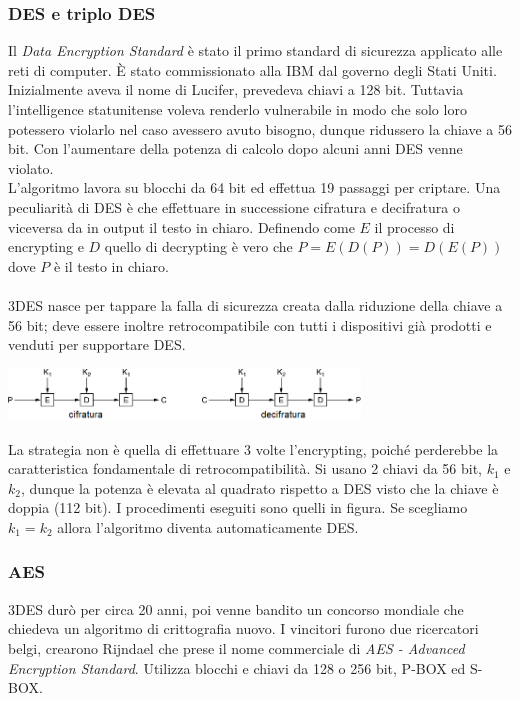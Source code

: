 \documentclass[10pt,a4paper,twoside]{article}
\begin{document}
\subsubsection{DES e triplo DES}
Il \textit{Data Encryption Standard} è stato il primo standard di sicurezza applicato alle reti di computer. È stato commissionato alla IBM dal governo degli Stati Uniti. Inizialmente aveva il nome di Lucifer, prevedeva chiavi a 128 bit. Tuttavia l'intelligence statunitense voleva renderlo vulnerabile in modo che solo loro potessero violarlo nel caso avessero avuto bisogno, dunque ridussero la chiave a 56 bit. Con l'aumentare della potenza di calcolo dopo alcuni anni DES venne violato.\\
L'algoritmo lavora su blocchi da 64 bit ed effettua 19 passaggi per criptare. Una peculiarità di DES è che effettuare in successione cifratura e decifratura o viceversa da in output il testo in chiaro. Definendo come $E$ il processo di encrypting e $D$ quello di decrypting è vero che $P=E(D(P))=D(E(P))$ dove $P$ è il testo in chiaro.\\\\
3DES nasce per tappare la falla di sicurezza creata dalla riduzione della chiave a 56 bit; deve essere inoltre retrocompatibile con tutti i dispositivi già prodotti e venduti per supportare DES.
\begin{center}
\includegraphics[width=0.7\textwidth]{images/3DES.png}
\end{center}
La strategia non è quella di effettuare 3 volte l'encrypting, poiché perderebbe la caratteristica fondamentale di retrocompatibilità. Si usano 2 chiavi da 56 bit, $k_1$ e $k_2$, dunque la potenza è elevata al quadrato rispetto a DES visto che la chiave è doppia (112 bit). I procedimenti eseguiti sono quelli in figura. Se scegliamo $k_1=k_2$ allora l'algoritmo diventa automaticamente DES.

\subsubsection{AES}
3DES durò per circa 20 anni, poi venne bandito un concorso mondiale che chiedeva un algoritmo di crittografia nuovo. I vincitori furono due ricercatori belgi, crearono Rijndael che prese il nome commerciale di \textit{AES - Advanced Encryption Standard}. Utilizza blocchi e chiavi da 128 o 256 bit, P-BOX ed S-BOX.
\end{document}
